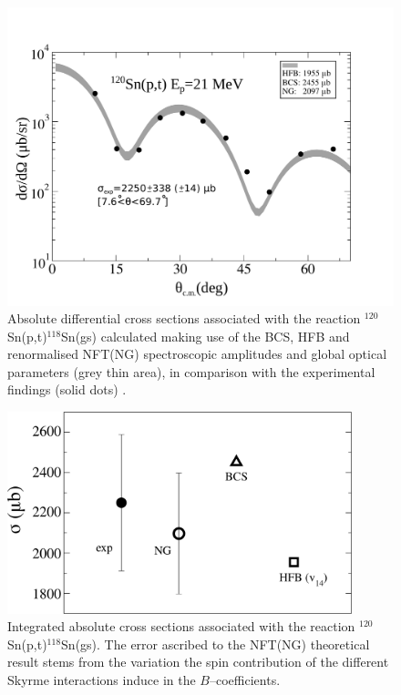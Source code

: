   \begin{figure}
  \centerline{\includegraphics*[width=12cm,angle=0]{C8/figsC8/Fig2_v2}}
  	\caption{Absolute differential  cross sections associated with the reaction
  	$^{120}$Sn(p,t)$^{118}$Sn(gs) calculated making use of the BCS, HFB and renormalised NFT(NG) spectroscopic 
  	amplitudes and global optical parameters (grey thin area), in comparison with the experimental findings (solid dots) \cite{Guazzoni:08}.}\label{fig6.4.2}
  \end{figure}
  \begin{figure}
  \centerline{\includegraphics*[width=10cm,angle=0]{C8/figsC8/fig5_v2}}
  	\caption{Integrated absolute  cross sections associated with the reaction
  	$^{120}$Sn(p,t)$^{118}$Sn(gs). The error ascribed  to
  	the NFT(NG) theoretical result stems from the variation the spin contribution of the different Skyrme interactions induce in the $B$--coefficients.}\label{fig6.4.3}
  \end{figure}
  

